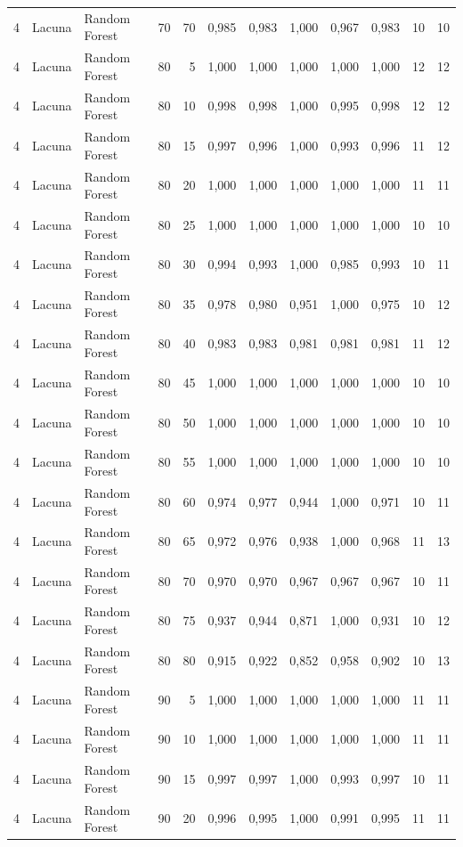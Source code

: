 \begin{longtable}{@{}rllrrrrrrrrr@{}}
4 & Lacuna & Random Forest & 70 & 70 & 0,985 & 0,983 & 1,000 & 0,967 & 0,983 & 10 & 10 \\
4 & Lacuna & Random Forest & 80 & 5 & 1,000 & 1,000 & 1,000 & 1,000 & 1,000 & 12 & 12 \\
4 & Lacuna & Random Forest & 80 & 10 & 0,998 & 0,998 & 1,000 & 0,995 & 0,998 & 12 & 12 \\
4 & Lacuna & Random Forest & 80 & 15 & 0,997 & 0,996 & 1,000 & 0,993 & 0,996 & 11 & 12 \\
4 & Lacuna & Random Forest & 80 & 20 & 1,000 & 1,000 & 1,000 & 1,000 & 1,000 & 11 & 11 \\
4 & Lacuna & Random Forest & 80 & 25 & 1,000 & 1,000 & 1,000 & 1,000 & 1,000 & 10 & 10 \\
4 & Lacuna & Random Forest & 80 & 30 & 0,994 & 0,993 & 1,000 & 0,985 & 0,993 & 10 & 11 \\
4 & Lacuna & Random Forest & 80 & 35 & 0,978 & 0,980 & 0,951 & 1,000 & 0,975 & 10 & 12 \\
4 & Lacuna & Random Forest & 80 & 40 & 0,983 & 0,983 & 0,981 & 0,981 & 0,981 & 11 & 12 \\
4 & Lacuna & Random Forest & 80 & 45 & 1,000 & 1,000 & 1,000 & 1,000 & 1,000 & 10 & 10 \\
4 & Lacuna & Random Forest & 80 & 50 & 1,000 & 1,000 & 1,000 & 1,000 & 1,000 & 10 & 10 \\
4 & Lacuna & Random Forest & 80 & 55 & 1,000 & 1,000 & 1,000 & 1,000 & 1,000 & 10 & 10 \\
4 & Lacuna & Random Forest & 80 & 60 & 0,974 & 0,977 & 0,944 & 1,000 & 0,971 & 10 & 11 \\
4 & Lacuna & Random Forest & 80 & 65 & 0,972 & 0,976 & 0,938 & 1,000 & 0,968 & 11 & 13 \\
4 & Lacuna & Random Forest & 80 & 70 & 0,970 & 0,970 & 0,967 & 0,967 & 0,967 & 10 & 11 \\
4 & Lacuna & Random Forest & 80 & 75 & 0,937 & 0,944 & 0,871 & 1,000 & 0,931 & 10 & 12 \\
4 & Lacuna & Random Forest & 80 & 80 & 0,915 & 0,922 & 0,852 & 0,958 & 0,902 & 10 & 13 \\
4 & Lacuna & Random Forest & 90 & 5 & 1,000 & 1,000 & 1,000 & 1,000 & 1,000 & 11 & 11 \\
4 & Lacuna & Random Forest & 90 & 10 & 1,000 & 1,000 & 1,000 & 1,000 & 1,000 & 11 & 11 \\
4 & Lacuna & Random Forest & 90 & 15 & 0,997 & 0,997 & 1,000 & 0,993 & 0,997 & 10 & 11 \\
4 & Lacuna & Random Forest & 90 & 20 & 0,996 & 0,995 & 1,000 & 0,991 & 0,995 & 11 & 11 \\

\end{longtable}
